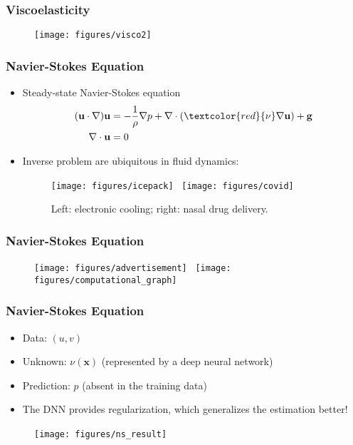 \documentclass[usenames,dvipsnames]{beamer}
\begin{document}
\begin{frame}
	\frametitle{Viscoelasticity}
	\begin{figure}[hbt]
		\texttt{[image: figures/visco2]}
	\end{figure}
	
\end{frame}


\begin{frame}
	\frametitle{Navier-Stokes Equation}
	\begin{itemize}
		\item Steady-state Navier-Stokes equation
		\begin{equation*}
		\begin{aligned}
		(\mathbf{u} \cdot \nabla) \mathbf{u} &=
		-\frac{1}{\rho} \nabla p + \nabla\cdot (\textcolor{red}{\nu} \nabla \mathbf{u}) + \mathbf{g}\\
		\nabla \cdot \mathbf{u} &= 0
		\end{aligned}
		\end{equation*}
		
		\item Inverse problem are ubiquitous in fluid dynamics:
		
		\begin{figure}[hbt]
			\centering
			\texttt{[image: figures/icepack]}~
			\texttt{[image: figures/covid]}
			\caption{Left: electronic cooling; right: nasal drug delivery.}
		\end{figure}
		
	\end{itemize}
	
\end{frame}


\begin{frame}
	\frametitle{Navier-Stokes Equation}
	
	\begin{figure}[hbt]
		\centering
		\texttt{[image: figures/advertisement]}~
		\texttt{[image: figures/computational\_graph]}
	\end{figure}
\end{frame}



\begin{frame}
	\frametitle{Navier-Stokes Equation}
	\begin{itemize}
		\item Data: $(u, v)$
		\item Unknown: $\nu(\mathbf{x})$ (represented by a deep neural network)
		\item Prediction: $p$ (absent in the training data) 
		\item The DNN provides regularization, which generalizes the estimation better!
	\end{itemize}
	\begin{figure}[hbt]
		\centering
		\texttt{[image: figures/ns\_result]}~
	\end{figure}
\end{frame}
\end{document}
